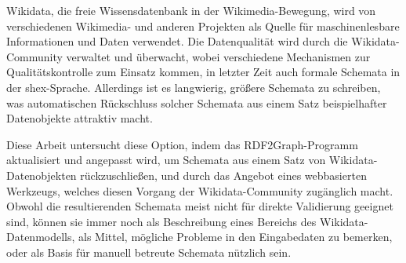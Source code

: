 
\Abstract
\Gls{Wikidata}, die freie Wissensdatenbank in der \gls{Wikimedia}-Bewegung,
wird von verschiedenen \gls{Wikimedia}- und anderen Projekten
als Quelle für maschinenlesbare Informationen und Daten verwendet.
Die Datenqualität wird durch die \gls{Wikidata}-Community verwaltet und überwacht,
wobei verschiedene Mechanismen zur Qualitätskontrolle zum Einsatz kommen,
in letzter Zeit auch formale Schemata in der \acrlong{shex}-Sprache.
Allerdings ist es langwierig, größere Schemata zu schreiben,
was automatischen Rückschluss solcher Schemata aus einem Satz beispielhafter Datenobjekte
attraktiv macht.

Diese Arbeit untersucht diese Option,
indem das \gls{RDF2Graph}-Programm aktualisiert und angepasst wird,
um Schemata aus einem Satz von \gls{Wikidata}-Datenobjekten rückzuschließen,
und durch das Angebot eines webbasierten Werkzeugs,
welches diesen Vorgang der \gls{Wikidata}-Community zugänglich macht.
Obwohl die resultierenden Schemata meist nicht für direkte Validierung geeignet sind,
können sie immer noch als Beschreibung eines Bereichs des \gls{Wikidata}-Datenmodells,
als Mittel, mögliche Probleme in den Eingabedaten zu bemerken,
oder als Basis für manuell betreute Schemata nützlich sein.
